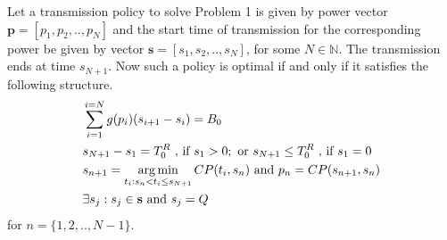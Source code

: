 \begin{theorem}
Let a transmission policy to solve Problem 1 is given by power vector $\textbf{p}=[p_1,p_2,..,p_N]$ and the start time of transmission for the corresponding power be given by vector $\textbf{s}=[s_1,s_2,..,s_N]$, for some $N\in \mathbb{N}$. The transmission ends at time $s_{N+1}$. Now such a policy is optimal if and only if it satisfies the following structure.
\label{th_algo1_1}
\begin{align}
&\sum_{i=1}^{i=N}g(p_i)(s_{i+1}-s_i)=B_0\label{claim1}
\\
&s_{N+1}-s_1=T^R_0 \text{ , if } s_1>0; \text{ or } s_{N+1}\le T^R_0 \text{ , if } s_1=0\label{claim2}
\\
&s_{n+1}=\argmin_{t_i: s_n < t_i \le s_{N+1}} CP(t_i,s_n)\text{ and } p_n=CP(s_{n+1},s_n)\label{claim3}
\\
&\exists s_j:s_j\in \textbf{s} \text{ and } s_j=Q\label{claim4}
\end{align}
for $n=\{ 1,2,..,N-1\}$.
\end{theorem}
